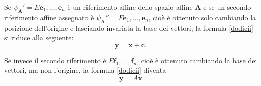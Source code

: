 \documentclass{article}
\theoremstyle{plain}
\theoremstyle{definition}
\theoremstyle{remark}
\begin{document}
\vspace{10pt}

Se $\psi_{\mathbf{A}}'=E\mathbf{e}_1, \dots, \mathbf{e}_n$ è un riferimento affine dello spazio affine $\mathbf{A}$ e se un secondo riferimento affine 
assegnato è $\psi_{\mathbf{A}}''=F\mathbf{e}_1, \dots, \mathbf{e}_n$, cioè è ottenuto solo cambiando la posizione dell'origine e lasciando invariata la base dei vettori, 
la formula \ref{dodicii} si riduce alla seguente:
\begin{equation}\label{dodiciquattro}
\mathbf{y} = \mathbf{x} + \mathbf{c}.    
\end{equation}

\vspace{10pt}

\begin{center}
\end{center}

\vspace{10pt}

Se invece il secondo riferimento è $E\mathbf{f}_1, \dots, \mathbf{f}_n$, cioè è ottenuto cambiando la base dei vettori, ma non l'origine, la formula \ref{dodicii} diventa
\begin{equation}\label{dodicicinque}
\mathbf{y} = A\mathbf{x}
\end{equation}

\vspace{10pt}

\begin{center}
\end{center}
\end{document}
